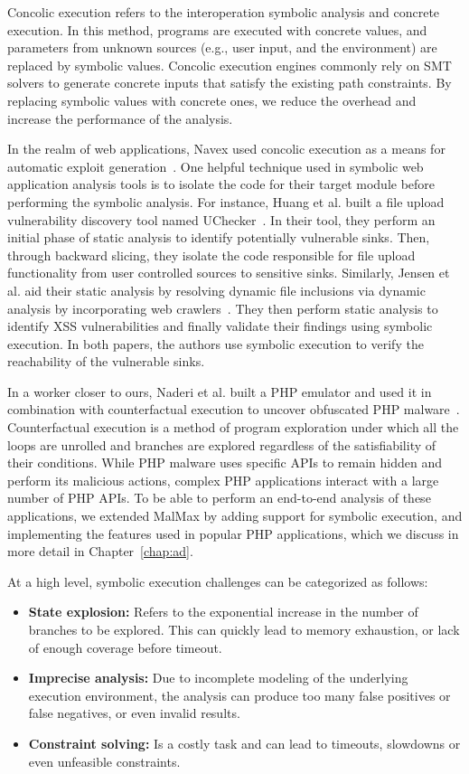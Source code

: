 Concolic execution refers to the interoperation symbolic analysis and concrete execution. 
In this method, programs are executed with concrete values, and parameters from unknown sources (e.g., user input, and the environment) are replaced by symbolic values. 
Concolic execution engines commonly rely on SMT solvers to generate concrete inputs that satisfy the existing path constraints. 
By replacing symbolic values with concrete ones, we reduce the overhead and increase the performance of the analysis. 

In the realm of web applications, Navex used concolic execution as a means for automatic exploit generation~\cite{alhuzali2018navex}. 
One helpful technique used in symbolic web application analysis tools is to isolate the code for their target module before performing the symbolic analysis. 
For instance, Huang et al. built a file upload vulnerability discovery tool named UChecker~\cite{Huang2019}. 
In their tool, they perform an initial phase of static analysis to identify potentially vulnerable sinks. 
Then, through backward slicing, they isolate the code responsible for file upload functionality from user controlled sources to sensitive sinks. 
Similarly, Jensen et al. aid their static analysis by resolving dynamic file inclusions via dynamic analysis by incorporating web crawlers~\cite{jensen2012thaps}. 
They then perform static analysis to identify XSS vulnerabilities and finally validate their findings using symbolic execution. 
In both papers, the authors use symbolic execution to verify the reachability of the vulnerable sinks. 

In a worker closer to ours, Naderi et al. built a PHP emulator and used it in combination with counterfactual execution to uncover obfuscated PHP malware~\cite{naderi2019cubismo,naderi2019malmax}. 
Counterfactual execution is a method of program exploration under which all the loops are unrolled and branches are explored regardless of the satisfiability of their conditions. 
While PHP malware uses specific APIs to remain hidden and perform its malicious actions, complex PHP applications interact with a large number of PHP APIs. 
To be able to perform an end-to-end analysis of these applications, we extended MalMax by adding support for symbolic execution, and implementing the features used in popular PHP applications, which we discuss in more detail in Chapter~\ref{chap:ad}. 

At a high level, symbolic execution challenges can be categorized as follows:
\begin{itemize}
    \item \textbf{State explosion:} Refers to the exponential increase in the number of branches to be explored. This can quickly lead to memory exhaustion, or lack of enough coverage before timeout.
    \item \textbf{Imprecise analysis:} Due to incomplete modeling of the underlying execution environment, the analysis can produce too many false positives or false negatives, or even invalid results. 
    \item \textbf{Constraint solving:} Is a costly task and can lead to timeouts, slowdowns or even unfeasible constraints.
\end{itemize}

